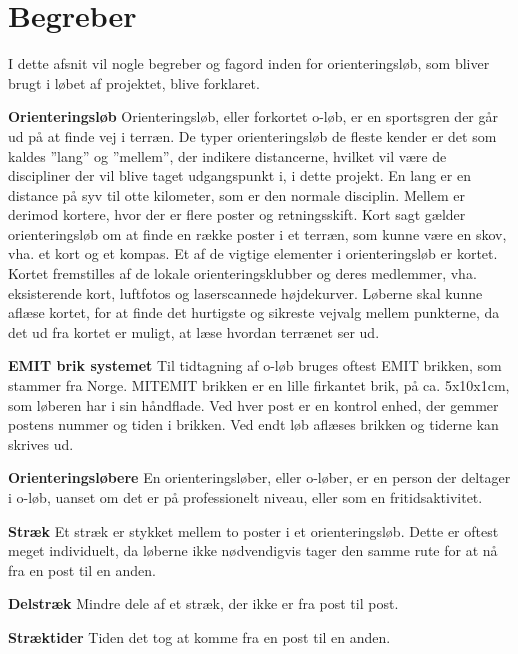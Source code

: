 \newpage
\section{Begreber}
I dette afsnit vil nogle begreber og fagord inden for orienteringsløb, som bliver brugt i løbet af projektet, blive forklaret.

\textbf{Orienteringsløb}\newline
Orienteringsløb, eller forkortet o-løb, er en sportsgren der går ud på at finde vej i terræn. \newline
De typer orienteringsløb de fleste kender er det som kaldes ”lang” og ”mellem”, der indikere distancerne, hvilket vil være de discipliner der vil blive taget udgangspunkt i, i dette projekt.\newline
En lang er en distance på syv til otte kilometer, som er den normale disciplin. Mellem er derimod kortere, hvor der er flere poster og retningsskift.\newline
Kort sagt gælder orienteringsløb om at finde en række poster i et terræn, som kunne være en skov, vha. et kort og et kompas. Et af de vigtige elementer i orienteringsløb er kortet. Kortet fremstilles af de lokale orienteringsklubber og deres medlemmer, vha. eksisterende kort, luftfotos og laserscannede højdekurver. Løberne skal kunne aflæse kortet, for at finde det hurtigste og sikreste vejvalg mellem punkterne, da det ud fra kortet er muligt, at læse hvordan terrænet ser ud. \citep{DOF}   

\textbf{EMIT brik systemet}\newline
Til tidtagning af o-løb bruges oftest EMIT brikken, som stammer fra Norge. MITEMIT brikken er en lille firkantet brik, på ca. 5x10x1cm, som løberen har i sin håndflade. Ved hver post er en kontrol enhed, der gemmer postens nummer og tiden i brikken. Ved endt løb aflæses brikken og tiderne kan skrives ud. 

\textbf{Orienteringsløbere}\newline
En orienteringsløber, eller o-løber, er en person der deltager i o-løb, uanset om det er på professionelt niveau, eller som en fritidsaktivitet.

\textbf{Stræk}\newline
Et stræk er stykket mellem to poster i et orienteringsløb. Dette er oftest meget individuelt, da løberne ikke nødvendigvis tager den samme rute for at nå fra en post til en anden.

\textbf{Delstræk}\newline
Mindre dele af et stræk, der ikke er fra post til post. 

\textbf{Stræktider}\newline
Tiden det tog at komme fra en post til en anden.\newline

